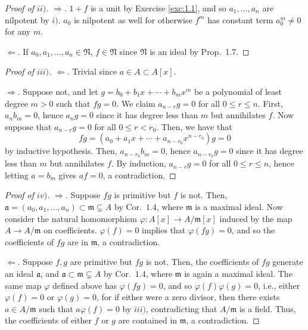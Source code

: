 \documentclass[12pt,letterpaper]{article}
\theoremstyle{definition}
\theoremstyle{remark}
\numberwithin{figure}{problem}
\numberwithin{equation}{section}
\begin{document}
\begin{proof}[Proof of $ii)$]
  $\Rightarrow$. $1 + f$ is a unit by Exercise \ref{exc:1.1}, and so $a_1,\ldots,a_n$ are nilpotent by $i)$. $a_0$ is nilpotent as well for otherwise $f^m$ has constant term $a_0^m \ne 0$ for any $m$.
  \par $\Leftarrow$. If $a_0,a_1,\ldots,a_n \in \mathfrak{N}$, $f \in \mathfrak{N}$ since $\mathfrak{N}$ is an ideal by Prop.~1.7.
\end{proof}
\begin{proof}[Proof of $iii)$]
  $\Leftarrow$. Trivial since $a \in A \subset A[x]$.
  \par $\Rightarrow$. Suppose not, and let $g = b_0 + b_1x + \cdots + b_mx^m$ be a polynomial of least degree $m > 0$ such that $fg = 0$. We claim $a_{n-r}g = 0$ for all $0 \le r \le n$. First, $a_nb_m=0$, hence $a_ng = 0$ since it has degree less than $m$ but annihilates $f$. Now suppose that $a_{n-r}g = 0$ for all $0 \le r < r_0$. Then, we have that
  \begin{equation*}
    fg = \left(a_0 + a_1x + \cdots + a_{n-r_0}x^{n-r_0}\right)g = 0
  \end{equation*}
  by inductive hypothesis. Then, $a_{n-r_0}b_m = 0$, hence $a_{n-r_0}g = 0$ since it has degree less than $m$ but annihilates $f$. By induction, $a_{n-r}g = 0$ for all $0 \le r \le n$, hence letting $a = b_m$ gives $af = 0$, a contradiction.
\end{proof}
\begin{proof}[Proof of $iv)$]
  $\Rightarrow$. Suppose $fg$ is primitive but $f$ is not. Then, $\mathfrak{a} = (a_0,a_1,\ldots,a_n) \subset \mathfrak{m} \subsetneq A$ by Cor.~$1.4$, where $\mathfrak{m}$ is a maximal ideal. Now consider the natural homomorphism $\varphi\colon A[x] \to A/\mathfrak{m}[x]$ induced by the map $A \to A/\mathfrak{m}$ on coefficients. $\varphi(f) = 0$ implies that $\varphi(fg) = 0$, and so the coefficients of $fg$ are in $\mathfrak{m}$, a contradiction.
  \par $\Leftarrow$. Suppose $f,g$ are primitive but $fg$ is not. Then, the coefficients of $fg$ generate an ideal $\mathfrak{a}$, and $\mathfrak{a} \subset \mathfrak{m} \subsetneq A$ by Cor.~$1.4$, where $\mathfrak{m}$ is again a maximal ideal. The same map $\varphi$ defined above has $\varphi(fg) = 0$, and so $\varphi(f)\varphi(g) = 0$, i.e., either $\varphi(f) = 0$ or $\varphi(g) = 0$, for if either were a zero divisor, then there exists $a \in A/\mathfrak{m}$ such that $a\varphi(f) = 0$ by $iii)$, contradicting that $A/\mathfrak{m}$ is a field. Thus, the coefficients of either $f$ or $g$ are contained in $\mathfrak{m}$, a contradiction. 
\end{proof}
\end{document}
